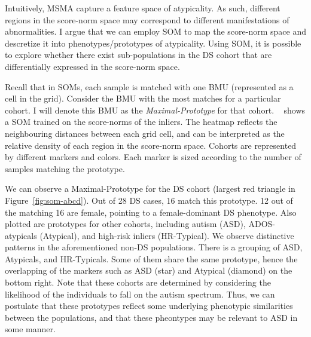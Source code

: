 Intuitively, MSMA capture a feature space of atypicality. As such, different regions in the score-norm space may correspond to different manifestations of abnormalities. I argue that we can employ SOM to map the score-norm space and descretize it into phenotypes/prototypes of atypicality. Using SOM, it is possible to explore whether there exist sub-populations in the DS cohort that are differentially expressed in the score-norm space. 

Recall that in SOMs, each sample is matched with one BMU (represented as a cell in the grid). Consider the BMU with the most matches for a particular cohort. I will denote this BMU as the \textit{Maximal-Prototype} for that cohort. ~ shows a SOM trained on the score-norms of the inliers. The heatmap reflects the neighbouring distances between each grid cell, and can be interpreted as the relative density of each region in the score-norm space. Cohorts are represented by different markers and colors. Each marker is sized according to the number of samples matching the prototype.

We can observe a Maximal-Prototype for the DS cohort (largest red triangle in Figure~\ref{fig:som-abcd}). Out of 28 DS cases, 16 match this prototype. 12 out of the matching 16 are female, pointing to a female-dominant DS phenotype. Also plotted are prototypes for other cohorts, including autism (ASD), ADOS-atypicals (Atypical), and high-risk inliers (HR-Typical). We observe distinctive patterns in the aforementioned non-DS populations. There is a grouping of ASD, Atypicals, and HR-Typicals. Some of them share the same prototype, hence the overlapping of the markers such as ASD (star) and Atypical (diamond) on the bottom right. Note that these cohorts are determined by considering the likelihood of the individuals to fall on the autism spectrum. Thus, we can postulate that these prototypes reflect some underlying phenotypic similarities between the populations, and that these pheontypes may be relevant to ASD in some manner.


